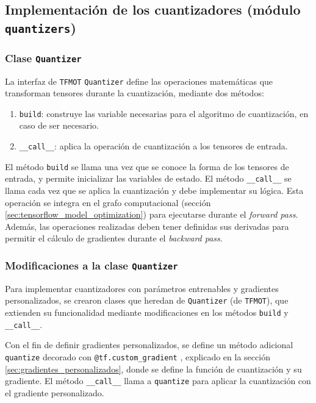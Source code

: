 \subsection{Implementación de los cuantizadores (módulo \texttt{quantizers})}
\label{sec:implementation_quantizers}

\subsubsection{Clase \texttt{Quantizer}}
La interfaz de \texttt{TFMOT} \texttt{Quantizer} \cite{tensorflow_quantizer_api} define las operaciones matemáticas que transforman tensores durante la cuantización, mediante dos métodos:

\begin{enumerate}
    \item \texttt{build}: construye las variable necesarias para el algoritmo de cuantización, en caso de ser necesario.
    \item \texttt{\_\_call\_\_}: aplica la operación de cuantización a los tensores de entrada.
\end{enumerate}

El método \texttt{build} se llama una vez que se conoce la forma de los tensores de entrada, y permite inicializar las variables de estado. El método \texttt{\_\_call\_\_} se llama cada vez que se aplica la cuantización y debe implementar su lógica. Esta operación se integra en el grafo computacional (sección \ref{sec:tensorflow_model_optimization}) para ejecutarse durante el \textit{forward pass}. Además, las operaciones realizadas deben tener definidas sus derivadas para permitir el cálculo de gradientes durante el \textit{backward pass}.

\subsubsection{Modificaciones a la clase \texttt{Quantizer}}

Para implementar cuantizadores con parámetros entrenables y gradientes personalizados, se crearon clases que heredan de \texttt{Quantizer} (de \texttt{TFMOT}), que extienden su funcionalidad mediante modificaciones en los métodos \texttt{build} y \texttt{\_\_call\_\_}.

Con el fin de definir gradientes personalizados, se define un método adicional \texttt{quantize} decorado con \texttt{@tf.custom\_gradient} \cite{tensorflow_custom_gradient}, explicado en la sección \ref{sec:gradientes_personalizados}, donde se define la función de cuantización y su gradiente. El método \texttt{\_\_call\_\_} llama a \texttt{quantize} para aplicar la cuantización con el gradiente personalizado.

